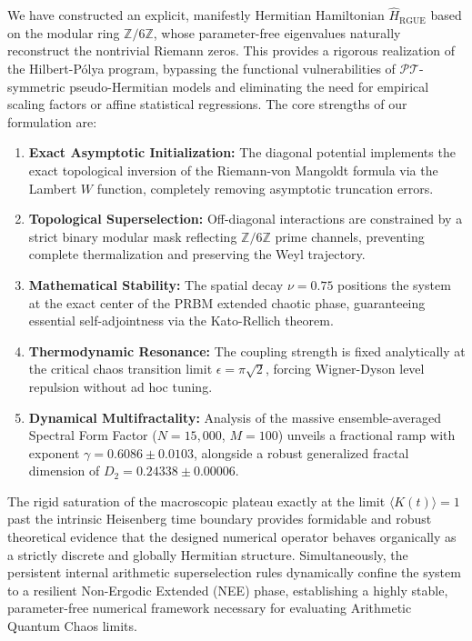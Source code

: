 \documentclass[aps,prl,preprint,superscriptaddress,floatfix]{revtex4-2}
\newcommand{\Zmod}{\mathbb{Z}/6\mathbb{Z}}
\begin{document}
We have constructed an explicit, manifestly Hermitian Hamiltonian $\hat{H}_{\text{RGUE}}$ based on the modular ring $\mathbb{Z}/6\mathbb{Z}$, whose parameter-free eigenvalues naturally reconstruct the nontrivial Riemann zeros.
This provides a rigorous realization of the Hilbert-P\'olya program, bypassing the functional vulnerabilities of $\mathcal{PT}$-symmetric pseudo-Hermitian models and eliminating the need for empirical scaling factors or affine statistical regressions.
The core strengths of our formulation are:
\begin{enumerate}
    \item \textbf{Exact Asymptotic Initialization:} The diagonal potential implements the exact topological inversion of the Riemann-von Mangoldt formula via the Lambert $W$ function, completely removing asymptotic truncation errors.
    \item \textbf{Topological Superselection:} Off-diagonal interactions are constrained by a strict binary modular mask reflecting $\Zmod$ prime channels, preventing complete thermalization and preserving the Weyl trajectory.
    \item \textbf{Mathematical Stability:} The spatial decay $\nu = 0.75$ positions the system at the exact center of the PRBM extended chaotic phase, guaranteeing essential self-adjointness via the Kato-Rellich theorem.
    \item \textbf{Thermodynamic Resonance:} The coupling strength is fixed analytically at the critical chaos transition limit $\epsilon = \pi \sqrt{2}$, forcing Wigner-Dyson level repulsion without ad hoc tuning.
    \item \textbf{Dynamical Multifractality:} Analysis of the massive ensemble-averaged Spectral Form Factor ($N=15,000$, $M=100$) unveils a fractional ramp with exponent $\gamma = 0.6086 \pm 0.0103$, alongside a robust generalized fractal dimension of $D_2 = 0.24338 \pm 0.00006$.
\end{enumerate}

The rigid saturation of the macroscopic plateau exactly at the limit $\langle K(t) \rangle = 1$ past the intrinsic Heisenberg time boundary provides formidable and robust theoretical evidence that the designed numerical operator behaves organically as a strictly discrete and globally Hermitian structure. Simultaneously, the persistent internal arithmetic superselection rules dynamically confine the system to a resilient Non-Ergodic Extended (NEE) phase, establishing a highly stable, parameter-free numerical framework necessary for evaluating Arithmetic Quantum Chaos limits.
\end{document}
